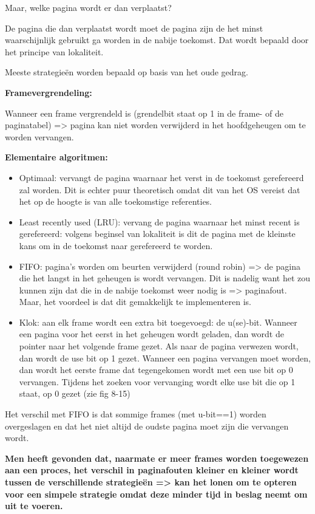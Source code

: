 Maar, welke pagina wordt er dan verplaatst?

De pagina die dan verplaatst wordt moet de pagina zijn de het minst waarschijnlijk gebruikt ga worden in de nabije toekomst. Dat wordt bepaald door het principe van lokaliteit.

Meeste strategieën worden bepaald op basis van het oude gedrag.

\textbf{Framevergrendeling:}

Wanneer een frame vergrendeld is (grendelbit staat op 1 in de frame- of de paginatabel) => pagina kan niet worden verwijderd in het hoofdgeheugen om te worden vervangen.


\textbf{Elementaire algoritmen:}

\begin{itemize}
\item Optimaal: vervangt de pagina waarnaar het verst in de toekomst gerefereerd zal worden. Dit is echter puur theoretisch omdat dit van het OS vereist dat het op de hoogte is van alle toekomstige referenties.
\item Least recently used (LRU): vervang de pagina waarnaar het minst recent is gerefereerd: volgens beginsel van lokaliteit is dit de pagina met de kleinste kans om in de toekomst naar gerefereerd te worden.
\item FIFO: pagina's worden om beurten verwijderd (round robin) => de pagina die het langst in het geheugen is wordt vervangen. Dit is nadelig want het zou kunnen zijn dat die in de nabije toekomst weer nodig is => paginafout. Maar, het voordeel is dat dit gemakkelijk te implementeren is.
\item Klok: aan elk frame wordt een extra bit toegevoegd: de u(se)-bit. Wanneer een pagina voor het eerst in het geheugen wordt geladen, dan wordt de pointer naar het volgende frame gezet. Als naar de pagina verwezen wordt, dan wordt de use bit op 1 gezet. Wanneer een pagina vervangen moet worden, dan wordt het eerste frame dat tegengekomen wordt met een use bit op 0 vervangen. Tijdens het zoeken voor vervanging wordt elke use bit die op 1 staat, op 0 gezet (zie fig 8-15)
\end{itemize}

Het verschil met FIFO is dat sommige frames (met u-bit==1) worden overgeslagen en dat het niet altijd de oudste pagina moet zijn die vervangen wordt.

\textbf{Men heeft gevonden dat, naarmate er meer frames worden toegewezen aan een proces, het verschil in paginafouten kleiner en kleiner wordt tussen de verschillende strategieën => kan het lonen om te opteren voor een simpele strategie omdat deze minder tijd in beslag neemt om uit te voeren.}


